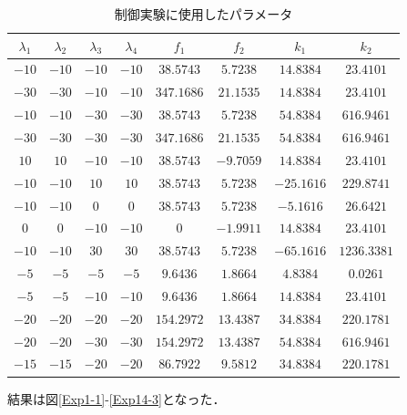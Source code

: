 \documentclass[12pt]{jsarticle}
\begin{document}
\begin{table}[tb]
  \begin{center}
    \label{TableB1-2}
    \caption{制御実験に使用したパラメータ}
    \begin{tabular}{|c|c|c|c|c|c|c|c|} \hline
      $\lambda_1$ & $\lambda_2$ & $\lambda_3$ & $\lambda_4$  & $f_1$ & $f_2$ & $k_1$ & $k_2$\\ \hline \hline
      $-10$ & $-10$ & $-10$ & $-10$ & $38.5743$  & $5.7238$  & $14.8384$  & $23.4101$  \\ \hline
      $-30$ & $-30$ & $-10$ & $-10$ & $347.1686$ & $21.1535$ & $14.8384$  & $23.4101$  \\ \hline
      $-10$ & $-10$ & $-30$ & $-30$ & $38.5743$  & $5.7238$  & $54.8384$  & $616.9461$ \\ \hline
      $-30$ & $-30$ & $-30$ & $-30$ & $347.1686$ & $21.1535$ & $54.8384$  & $616.9461$ \\ \hline
       $10$ &  $10$ & $-10$ & $-10$ & $38.5743$  & $-9.7059$ & $14.8384$  & $23.4101$  \\ \hline
      $-10$ & $-10$ & $10$  &  $10$ & $38.5743$  & $5.7238$  & $-25.1616$ & $229.8741$ \\ \hline
      $-10$ & $-10$ & $0$   & $0$   & $38.5743$  & $5.7238$  & $-5.1616$  & $26.6421$  \\ \hline
      $0$   & $0$   & $-10$ & $-10$ & $0$        & $-1.9911$ & $14.8384$  & $23.4101$  \\ \hline
      $-10$ & $-10$ & $30$  & $30$  & $38.5743$  & $5.7238$  & $-65.1616$ & $1236.3381$\\ \hline
      $-5$  & $-5$  & $-5$  & $-5$  & $9.6436$   & $1.8664$  & $4.8384$   & $0.0261$   \\ \hline
      $-5$  & $-5$  & $-10$ & $-10$ & $9.6436$   & $1.8664$  & $14.8384$  & $23.4101$  \\ \hline
      $-20$ & $-20$ & $-20$ & $-20$ & $154.2972$ & $13.4387$ & $34.8384$  & $220.1781$ \\ \hline
      $-20$ & $-20$ & $-30$ & $-30$ & $154.2972$ & $13.4387$ & $54.8384$  & $616.9461$ \\ \hline
      $-15$ & $-15$ & $-20$ & $-20$ & $86.7922$  & $9.5812$  & $34.8384$  & $220.1781$ \\ \hline
    \end{tabular}
  \end{center}
\end{table}
結果は図\ref{Exp1-1}-\ref{Exp14-3}となった．

\clearpage
\newpage
\newpage
\end{document}
